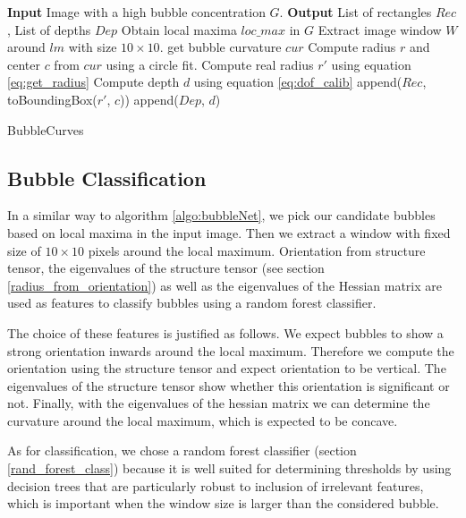 		\begin{algorithm}
			\begin{algorithmic}[1]
				\State \textbf{Input} Image with a high bubble concentration $G$. 
				\State \textbf{Output} List of rectangles $Rec$, List of depths $Dep$
				\State Obtain local maxima $loc\_max$ in $G$
					\State Extract image window $W$ around $lm$ with size $10 \times 10$.
						\State get bubble curvature $cur$ 
						\State Compute radius $r$ and center $c$ from $cur$ using a circle fit.
						\State Compute real radius $r'$ using equation \ref{eq:get_radius}
						\State Compute depth $d$ using equation \ref{eq:dof_calib}
						\State append($Rec$, toBoundingBox($r'$, $c$))
						\State append($Dep$, $d$)
					\EndIf
				\EndFor
			\end{algorithmic}
			
			\caption{BubbleCurves}
			\label{algo:bubbleCurves}
		\end{algorithm}
	
	
	
	
	
	
	\subsection{Bubble Classification}\label{bubble_classification}
		In a similar way to algorithm \ref{algo:bubbleNet}, we pick our candidate bubbles based on local maxima in the input image. Then we extract a window with fixed size of $10 \times 10$ pixels around the local maximum. Orientation from structure tensor, the eigenvalues of the structure tensor (see section \ref{radius_from_orientation}) as well as the eigenvalues of the Hessian matrix are used as features to classify bubbles using a random forest classifier. 
		
		The choice of these features is justified as follows. We expect bubbles to show a strong orientation inwards around the local maximum. Therefore we compute the orientation using the structure tensor and expect orientation to be vertical. The eigenvalues of the structure tensor show whether this orientation is significant or not. Finally, with the eigenvalues of the hessian matrix we can determine the curvature around the local maximum, which is expected to be concave. 
		
		As for classification, we chose a random forest classifier (section \ref{rand_forest_class}) because it is well suited for determining thresholds by using decision trees that are particularly robust to inclusion of irrelevant features, which is important when the window size is larger than the considered bubble.
		
